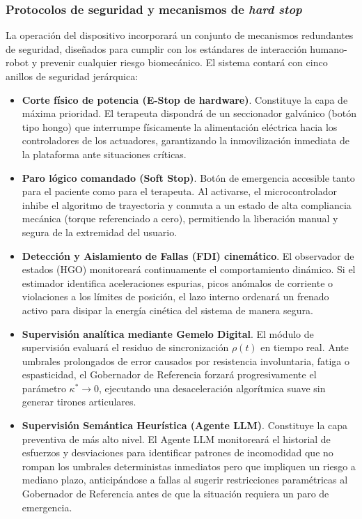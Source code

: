 \documentclass[a4paper,12pt]{article}
\begin{document}
\subsubsection{Protocolos de seguridad y mecanismos de \textit{hard stop}}

La operación del dispositivo incorporará un conjunto de mecanismos redundantes de seguridad, diseñados para cumplir con los estándares de interacción humano-robot y prevenir cualquier riesgo biomecánico. El sistema contará con cinco anillos de seguridad jerárquica:

\begin{itemize}
    \item \textbf{Corte físico de potencia (E-Stop de hardware)}. Constituye la capa de máxima prioridad. El terapeuta dispondrá de un seccionador galvánico (botón tipo hongo) que interrumpe físicamente la alimentación eléctrica hacia los controladores de los actuadores, garantizando la inmovilización inmediata de la plataforma ante situaciones críticas.

    \item \textbf{Paro lógico comandado (Soft Stop)}. Botón de emergencia accesible tanto para el paciente como para el terapeuta. Al activarse, el microcontrolador inhibe el algoritmo de trayectoria y conmuta a un estado de alta compliancia mecánica (torque referenciado a cero), permitiendo la liberación manual y segura de la extremidad del usuario.

    \item \textbf{Detección y Aislamiento de Fallas (FDI) cinemático}. El observador de estados (HGO) monitoreará continuamente el comportamiento dinámico. Si el estimador identifica aceleraciones espurias, picos anómalos de corriente o violaciones a los límites de posición, el lazo interno ordenará un frenado activo para disipar la energía cinética del sistema de manera segura.

    \item \textbf{Supervisión analítica mediante Gemelo Digital}. El módulo de supervisión evaluará el residuo de sincronización $\rho(t)$ en tiempo real. Ante umbrales prolongados de error causados por resistencia involuntaria, fatiga o espasticidad, el Gobernador de Referencia forzará progresivamente el parámetro $\kappa^{*} \to 0$, ejecutando una desaceleración algorítmica suave sin generar tirones articulares.

    \item \textbf{Supervisión Semántica Heurística (Agente LLM)}. Constituye la capa preventiva de más alto nivel. El Agente LLM monitoreará el historial de esfuerzos y desviaciones para identificar patrones de incomodidad que no rompan los umbrales deterministas inmediatos pero que impliquen un riesgo a mediano plazo, anticipándose a fallas al sugerir restricciones paramétricas al Gobernador de Referencia antes de que la situación requiera un paro de emergencia.
\end{itemize}
\end{document}
